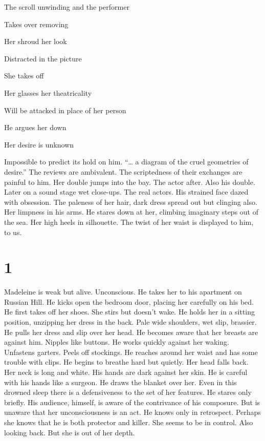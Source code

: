 \documentclass[
]{memoir}
\begin{document}
The scroll unwinding and the performer

Takes over removing

Her shroud her look

Distracted in the picture

She takes off

Her glasses her theatricality

Will be attacked in place of her person

He argues her down

Her desire is unknown

Impossible to predict its hold on him. ``\ldots{} a diagram of the cruel
geometries of desire.'' The reviews are ambivalent. The scriptedness of
their exchanges are painful to him. Her double jumps into the bay. The
actor after. Also his double. Later on a sound stage wet close-ups. The
real actors. His strained face dazed with obsession. The paleness of her
hair, dark dress spread out but clinging also. Her limpness in his arms.
He stares down at her, climbing imaginary steps out of the sea. Her high
heels in silhouette. The twist of her waist is displayed to him, to us.

\hypertarget{section-13}{%
\section*{1}\label{section-13}}

Madeleine is weak but alive. Unconscious. He takes her to his apartment
on Russian Hill. He kicks open the bedroom door, placing her carefully
on his bed. He first takes off her shoes. She stirs but doesn't wake. He
holds her in a sitting position, unzipping her dress in the back. Pale
wide shoulders, wet slip, brassier. He pulls her dress and slip over her
head. He becomes aware that her breasts are against him. Nipples like
buttons. He works quickly against her waking. Unfastens garters. Peels
off stockings. He reaches around her waist and has some trouble with
clips. He begins to breathe hard but quietly. Her head falls back. Her
neck is long and white. His hands are dark against her skin. He is
careful with his hands like a surgeon. He draws the blanket over her.
Even in this drowned sleep there is a defensiveness to the set of her
features. He stares only briefly. His audience, himself, is aware of the
contrivance of his composure. But is unaware that her unconsciousness is
an act. He knows only in retrospect. Perhaps she knows that he is both
protector and killer. She seems to be in control. Also looking back. But
she is out of her depth.
\end{document}
